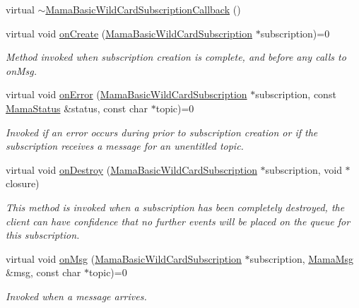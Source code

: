 \begin{DoxyCompactItemize}
\item 
virtual \hyperlink{classWombat_1_1MamaBasicWildCardSubscriptionCallback_a560e1a8de5344d6075f5126616f97a73}{$\sim$MamaBasicWildCardSubscriptionCallback} ()
\item 
virtual void \hyperlink{classWombat_1_1MamaBasicWildCardSubscriptionCallback_aa301ef6cc86858276e6ca9008c738717}{onCreate} (\hyperlink{classWombat_1_1MamaBasicWildCardSubscription}{MamaBasicWildCardSubscription} $\ast$subscription)=0
\begin{DoxyCompactList}\small\item\em Method invoked when subscription creation is complete, and before any calls to {\ttfamily onMsg}. \item\end{DoxyCompactList}\item 
virtual void \hyperlink{classWombat_1_1MamaBasicWildCardSubscriptionCallback_a89212077d27b4799729d606471df27fa}{onError} (\hyperlink{classWombat_1_1MamaBasicWildCardSubscription}{MamaBasicWildCardSubscription} $\ast$subscription, const \hyperlink{classWombat_1_1MamaStatus}{MamaStatus} \&status, const char $\ast$topic)=0
\begin{DoxyCompactList}\small\item\em Invoked if an error occurs during prior to subscription creation or if the subscription receives a message for an unentitled topic. \item\end{DoxyCompactList}\item 
virtual void \hyperlink{classWombat_1_1MamaBasicWildCardSubscriptionCallback_ac92c3c2a87d78f82257b57b902b1eb41}{onDestroy} (\hyperlink{classWombat_1_1MamaBasicWildCardSubscription}{MamaBasicWildCardSubscription} $\ast$subscription, void $\ast$closure)
\begin{DoxyCompactList}\small\item\em This method is invoked when a subscription has been completely destroyed, the client can have confidence that no further events will be placed on the queue for this subscription. \item\end{DoxyCompactList}\item 
virtual void \hyperlink{classWombat_1_1MamaBasicWildCardSubscriptionCallback_aac6e6572d42f3ceb8a354a79a0171cf2}{onMsg} (\hyperlink{classWombat_1_1MamaBasicWildCardSubscription}{MamaBasicWildCardSubscription} $\ast$subscription, \hyperlink{classWombat_1_1MamaMsg}{MamaMsg} \&msg, const char $\ast$topic)=0
\begin{DoxyCompactList}\small\item\em Invoked when a message arrives. \item\end{DoxyCompactList}\end{DoxyCompactItemize}


